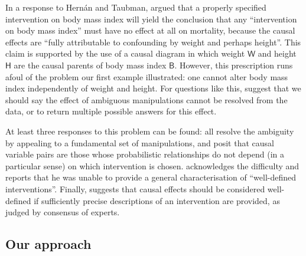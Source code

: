 \documentclass{article}
\theoremstyle{plain}
\theoremstyle{definition}
\newcommand{\RV}[1]{\ensuremath{\mathsf{#1}}}
\begin{document}

In a response to Hernán and Taubman, \citet{shahar_association_2009} argued that a properly specified intervention on body mass index will yield the conclusion that any ``intervention on body mass index'' must have no effect at all on mortality, because the causal effects are ``fully attributable to confounding by weight and perhaps height''. This claim is supported by the use of a causal diagram in which weight $\RV{W}$ and height $\RV{H}$ are the causal parents of body mass index $\RV{B}$. However, this prescription runs afoul of the problem our first example illustrated: one cannot alter body mass index independently of weight and height. For questions like this, \citet{spirtes_causal_2004} suggest that we should say the effect of ambiguous manipulations cannot be resolved from the data, or to return multiple possible answers for this effect.

At least three responses to this problem can be found: \citet{spirtes_causal_2004,eberhardt_contemporary_2022,chalupka_causal_2017} all resolve the ambiguity by appealing to a fundamental set of manipulations, and posit that causal variable pairs are those whose probabilistic relationships do not depend (in a particular sense) on which intervention is chosen. \citet{woodward_causation_2016} acknowledges the difficulty and reports that he was unable to provide a general characterisation of ``well-defined interventions''. Finally, \citet{noauthor_does_2016} suggests that causal effects should be considered well-defined if sufficiently precise descriptions of an intervention are provided, as judged by consensus of experts.

\subsection{Our approach}
\end{document}
